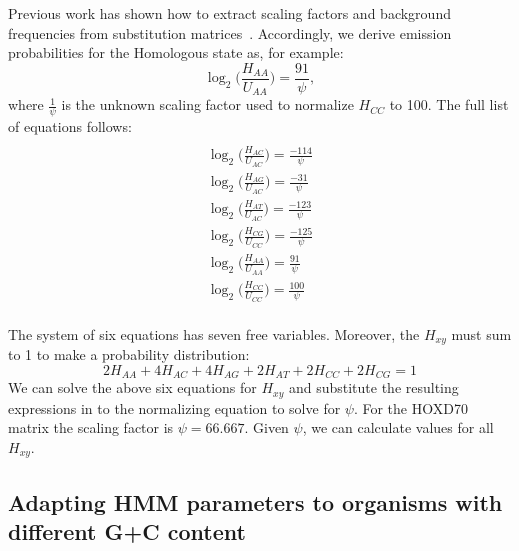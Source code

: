 Previous work
has shown how to extract scaling factors and background frequencies from substitution matrices~\cite{ref-rev3a}. Accordingly, we derive emission probabilities for
the Homologous state as, for example:
\begin{equation}
\log_{2}\bigg(\frac{H_{AA}}{U_{AA}}\bigg) = \frac{91}{\psi},
\end{equation}
where $\frac{1}{\psi}$ is the unknown scaling factor used to normalize $H_{CC}$ to 100. The full list of equations follows:
\begin{multline}\\
\log_{2}\bigg(\frac{H_{AC}}{U_{AC}}\bigg) = \frac{-114}{\psi}\\
\log_{2}\bigg(\frac{H_{AG}}{U_{AC}}\bigg) = \frac{-31}{\psi}\\
\log_{2}\bigg(\frac{H_{AT}}{U_{AC}}\bigg) = \frac{-123}{\psi}\\
\log_{2}\bigg(\frac{H_{CG}}{U_{CC}}\bigg) = \frac{-125}{\psi}\\
\log_{2}\bigg(\frac{H_{AA}}{U_{AA}}\bigg) = \frac{91}{\psi}\\
\log_{2}\bigg(\frac{H_{CC}}{U_{CC}}\bigg) = \frac{100}{\psi}\\
\end{multline}

The system of six equations has seven free variables.  Moreover, the $H_{xy}$ must sum to 1 to make a probability distribution:
\begin{equation}
2H_{AA} + 4H_{AC} + 4H_{AG} + 2H_{AT} + 2H_{CC} + 2H_{CG} = 1
\end{equation}
We can solve the above six equations for $H_{xy}$ and substitute the
resulting expressions in to the normalizing equation to solve for
$\psi$. For the HOXD70 matrix the scaling factor is $\psi=66.667$. Given
$\psi$, we can calculate values for all $H_{xy}$.

\subsection*{Adapting HMM parameters to organisms with different G+C content}

